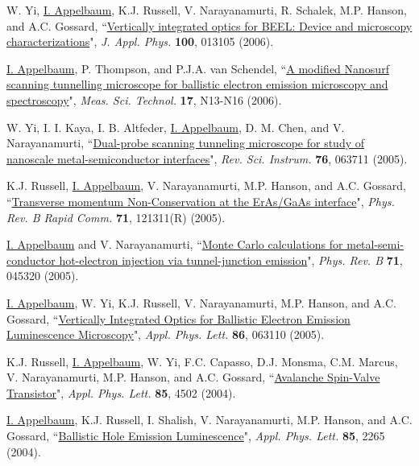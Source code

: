 \documentclass[paper=letter,fontsize=11pt]{scrartcl} %
\newcommand{\PaperEntry}[7]{
		\noindent #1, ``\href{#7}{#2}", \textit{#3} \textbf{#4}, #5 (#6).}
\begin{document}
\begin{etaremune}
\item\PaperEntry{W. Yi, \underline{I. Appelbaum}, K.J. Russell, V. Narayanamurti, R. Schalek, M.P. Hanson, and A.C. Gossard}{Vertically integrated optics for BEEL: Device and microscopy characterizations}{J. Appl. Phys.}{100}{013105}{2006}{http://dx.doi.org/10.1063/1.2208738}

\item\PaperEntry{\underline{I. Appelbaum}, P. Thompson, and P.J.A. van Schendel}{A modified Nanosurf scanning tunnelling microscope for ballistic electron emission microscopy and spectroscopy}{Meas. Sci. Technol.}{17}{N13-N16}{2006}{http://dx.doi.org/10.1088/0957-0233/17/4/N02}

\item\PaperEntry{W. Yi, I. I. Kaya, I. B. Altfeder, \underline{I. Appelbaum}, D. M. Chen, and V. Narayanamurti}{Dual-probe scanning tunneling microscope for study of nanoscale metal-semiconductor interfaces}{Rev. Sci. Instrum.}{76}{063711}{2005}{http://dx.doi.org/10.1063/1.1938969}

\item\PaperEntry{K.J. Russell, \underline{I. Appelbaum}, V. Narayanamurti, M.P. Hanson, and A.C. Gossard}{Transverse momentum Non-Conservation at the ErAs/GaAs interface}{Phys. Rev. B Rapid Comm.}{71}{121311(R)}{2005}{http://dx.doi.org/10.1103/PhysRevB.71.121311} 

\item\PaperEntry{\underline{I. Appelbaum} and V. Narayanamurti}{Monte Carlo calculations for metal-semi-conductor hot-electron injection via tunnel-junction emission}{Phys. Rev. B}{71}{045320}{2005}{http://dx.doi.org/10.1103/PhysRevB.71.045320}

\item\PaperEntry{\underline{I. Appelbaum}, W. Yi, K.J. Russell, V. Narayanamurti, M.P. Hanson, and A.C. Gossard}{Vertically Integrated Optics for Ballistic Electron Emission Luminescence Microscopy}{Appl. Phys. Lett.}{86}{063110}{2005}{http://dx.doi.org/10.1063/1.1861961}

\item\PaperEntry{K.J. Russell, \underline{I. Appelbaum}, W. Yi, F.C. Capasso, D.J. Monsma, C.M. Marcus, V. Narayanamurti, M.P. Hanson, and A.C. Gossard}{Avalanche Spin-Valve Transistor}{Appl. Phys. Lett.}{85}{4502}{2004}{http://dx.doi.org/10.1063/1.1818339}

\item\PaperEntry{\underline{I. Appelbaum}, K.J. Russell, I. Shalish, V. Narayanamurti, M.P. Hanson, and A.C. Gossard}{Ballistic Hole Emission Luminescence}{Appl. Phys. Lett.}{85}{2265}{2004}{http://dx.doi.org/10.1063/1.1793347}


\end{etaremune}
\end{document}
